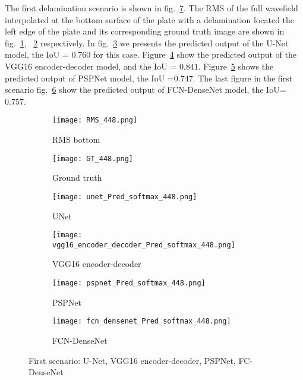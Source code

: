 The first delamination scenario is shown in fig.~\ref{fig:softmax_448}. 
The RMS of the full wavefield interpolated at the bottom surface of the plate with a delamination located the left edge of the plate and its corresponding ground truth image are shown in fig.~\ref{fig:RMS_flat_shell_Vz_448}, ~\ref{fig:m1_rand_single_delam_448} respectively. 
In fig.~\ref{fig:unet_pred_448} we presents the predicted output of the U-Net model, the IoU = \(0.760\) for this case.
Figure~\ref{fig:vgg16_pred_448} show the predicted output of the VGG16 encoder-decoder model, and the IoU = \(0.841\). 
Figure~\ref{fig:pspnet_pred_448} shows the predicted output of PSPNet model, the IoU =\(0.747\).
The last figure in the first scenario fig.~\ref{fig:fcn_densenet_pred_448}	show the predicted output of FCN-DenseNet model, the IoU=\(0.757\).
\begin{figure} [!h]
	\centering
	\begin{subfigure}[b]{0.47\textwidth}
		\centering
		\texttt{[image: RMS\_448.png]}
		\caption{RMS bottom}
		\label{fig:RMS_flat_shell_Vz_448}
	\end{subfigure}
	\hfill
	\begin{subfigure}[b]{0.47\textwidth}
		\centering
		\texttt{[image: GT\_448.png]}
		\caption{Ground truth}
		\label{fig:m1_rand_single_delam_448}
	\end{subfigure}
	\begin{subfigure}[b]{0.47\textwidth}
		\centering
		\texttt{[image: unet\_Pred\_softmax\_448.png]}
		\caption{UNet}
		\label{fig:unet_pred_448}
	\end{subfigure}
	\hfill
	\begin{subfigure}[b]{0.47\textwidth}
		\centering
		\texttt{[image: vgg16\_encoder\_decoder\_Pred\_softmax\_448.png]}
		\caption{VGG16 encoder-decoder}
		\label{fig:vgg16_pred_448}
	\end{subfigure}
	\hfill
	\begin{subfigure}[b]{0.47\textwidth}
		\centering
		\texttt{[image: pspnet\_Pred\_softmax\_448.png]}
		\caption{PSPNet}
		\label{fig:pspnet_pred_448}
	\end{subfigure}
	\hfill
	\begin{subfigure}[b]{0.47\textwidth}
		\centering
		\texttt{[image: fcn\_densenet\_Pred\_softmax\_448.png]}
		\caption{FCN-DenseNet}
		\label{fig:fcn_densenet_pred_448}
	\end{subfigure}
	\caption{First scenario: U-Net, VGG16 encoder-decoder, PSPNet, FC-DenseNet}
	\label{fig:softmax_448}
\end{figure} 

